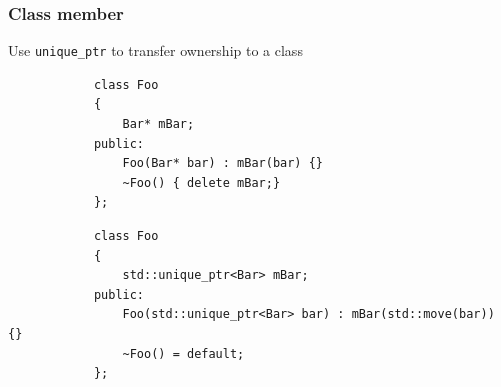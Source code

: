 \documentclass{beamer}
\begin{document}
\begin{frame}[fragile]
\frametitle{Class member}
	Use \texttt{unique\_ptr} to transfer ownership to a class
	\begin{example}
		\begin{lstlisting}
			class Foo
			{
				Bar* mBar;
			public:
				Foo(Bar* bar) : mBar(bar) {}
				~Foo() { delete mBar;}
			};
		\end{lstlisting}
	\end{example}
    \begin{example}
		\begin{lstlisting}
			class Foo
			{
				std::unique_ptr<Bar> mBar;
			public:
				Foo(std::unique_ptr<Bar> bar) : mBar(std::move(bar)) {}
				~Foo() = default;
			};
		\end{lstlisting}
	\end{example}
\end{frame}
\end{document}
